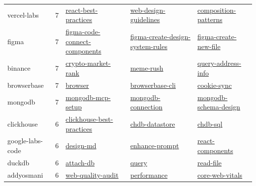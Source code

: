 \documentclass[UTF8,a4paper,12pt]{ctexart}
\begin{document}
\begin{longtable}{p{2.8cm} r p{4.2cm} p{4.2cm} p{4.2cm}}
vercel-labs & 7 & \href{https://officialskills.sh/vercel-labs/skills/react-best-practices}{react-best-practices} & \href{https://officialskills.sh/vercel-labs/skills/web-design-guidelines}{web-design-guidelines} & \href{https://officialskills.sh/vercel-labs/skills/composition-patterns}{composition-patterns} \\
figma & 7 & \href{https://officialskills.sh/figma/skills/figma-code-connect-components}{figma-code-connect-components} & \href{https://officialskills.sh/figma/skills/figma-create-design-system-rules}{figma-create-design-system-rules} & \href{https://officialskills.sh/figma/skills/figma-create-new-file}{figma-create-new-file} \\
binance & 7 & \href{https://officialskills.sh/binance/skills/crypto-market-rank}{crypto-market-rank} & \href{https://officialskills.sh/binance/skills/meme-rush}{meme-rush} & \href{https://officialskills.sh/binance/skills/query-address-info}{query-address-info} \\
browserbase & 7 & \href{https://officialskills.sh/browserbase/skills/browser}{browser} & \href{https://officialskills.sh/browserbase/skills/browserbase-cli}{browserbase-cli} & \href{https://officialskills.sh/browserbase/skills/cookie-sync}{cookie-sync} \\
mongodb & 7 & \href{https://officialskills.sh/mongodb/skills/mongodb-mcp-setup}{mongodb-mcp-setup} & \href{https://officialskills.sh/mongodb/skills/mongodb-connection}{mongodb-connection} & \href{https://officialskills.sh/mongodb/skills/mongodb-schema-design}{mongodb-schema-design} \\
clickhouse & 6 & \href{https://officialskills.sh/clickhouse/skills/clickhouse-best-practices}{clickhouse-best-practices} & \href{https://officialskills.sh/clickhouse/skills/chdb-datastore}{chdb-datastore} & \href{https://officialskills.sh/clickhouse/skills/chdb-sql}{chdb-sql} \\
google-labs-code & 6 & \href{https://officialskills.sh/google-labs-code/skills/design-md}{design-md} & \href{https://officialskills.sh/google-labs-code/skills/enhance-prompt}{enhance-prompt} & \href{https://officialskills.sh/google-labs-code/skills/react-components}{react-components} \\
duckdb & 6 & \href{https://officialskills.sh/duckdb/skills/attach-db}{attach-db} & \href{https://officialskills.sh/duckdb/skills/query}{query} & \href{https://officialskills.sh/duckdb/skills/read-file}{read-file} \\
addyosmani & 6 & \href{https://officialskills.sh/addyosmani/skills/web-quality-audit}{web-quality-audit} & \href{https://officialskills.sh/addyosmani/skills/performance}{performance} & \href{https://officialskills.sh/addyosmani/skills/core-web-vitals}{core-web-vitals} \\

\end{longtable}
\end{document}
